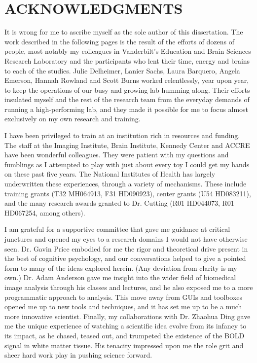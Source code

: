 \documentclass[12pt]{report}  %
\begin{document}
\chapter*{ACKNOWLEDGMENTS}
\vspace{7mm}

It is wrong for me to ascribe myself as the sole author of this dissertation. The work described in the following pages is the result of the efforts of dozens of people, most notably my colleagues in Vanderbilt's Education and Brain Sciences Research Laboratory and the participants who lent their time, energy and brains to each of the studies. Julie Delheimer, Lanier Sachs, Laura Barquero, Angela Emerson, Hannah Rowland and Scott Burns worked relentlessly, year upon year, to keep the operations of our busy and growing lab humming along. Their efforts insulated myself and the rest of the research team from the everyday demands of running a high-performing lab, and they made it possible for me to focus almost exclusively on my own research and training. 

I have been privileged to train at an institution rich in resources and funding. The staff at the Imaging Institute, Brain Institute, Kennedy Center and ACCRE have been wonderful colleagues. They were patient with my questions and fumblings as I attempted to play with just about every toy I could get my hands on these past five years. The National Institutes of Health has largely underwritten these experiences, through a variety of mechanisms. These include training grants (T32 MH064913, F31 HD090923), center grants (U54 HD083211), and the many research awards granted to Dr. Cutting (R01 HD044073, R01 HD067254, among others).

I am grateful for a supportive committee that gave me guidance at critical junctures and opened my eyes to a research domains I would not have otherwise seen. Dr. Gavin Price embodied for me the rigor and theoretical drive present in the best of cognitive psychology, and our conversations helped to give a pointed form to many of the ideas explored herein. (Any deviation from clarity is my own.) Dr. Adam Anderson gave me insight into the wider field of biomedical image analysis through his classes and lectures, and he also exposed me to a more programmatic approach to analysis. This move away from GUIs and toolboxes opened me up to new tools and techniques, and it has set me up to be a much more innovative scientist. Finally, my collaborations with Dr. Zhaohua Ding gave me the unique experience of watching a scientific idea evolve from its infancy to its impact, as he chased, teased out, and trumpeted the existence of the BOLD signal in white matter tissue. His tenacity impressed upon me the role grit and sheer hard work play in pushing science forward. 
\end{document}
